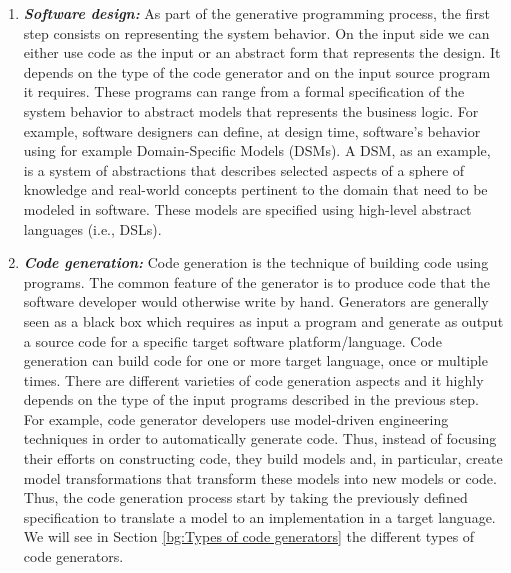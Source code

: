 \begin{enumerate}
	\item \textbf{\textit{Software design:}} 
	As part of the generative programming process, the first step consists on representing the system behavior. 
	On the input side we can either use code as the input or an abstract form that represents the design. It depends on the type of the code generator and on the input source program it requires. These programs can range from a formal specification of the system behavior to abstract models that represents the business logic.
	For example, software designers can define, at design time, software’s behavior using for example Domain-Specific Models (DSMs).
	A DSM, as an example, is a system of abstractions that describes selected aspects of a sphere of knowledge and real-world concepts pertinent to the domain that need to be modeled in software. These models are specified using high-level abstract languages (i.e., DSLs). %
	
	\item \textbf{\textit{Code generation:}} 
	Code generation is the technique of building code using programs. The common feature of the generator is to produce code that the software developer would otherwise write by hand.
	Generators are generally seen as a black box which requires as input a program and generate as output a source code for a specific target software platform/language. %
	Code generation can build code for one or more target language, once or multiple times. There are different varieties of code generation aspects and it highly depends on the type of the input programs described in the previous step. 
	For example, code generator developers use model-driven engineering techniques in order to automatically generate code. Thus, instead of focusing their efforts on constructing code, they build models and, in particular, create model transformations that transform these models into new models or code. Thus, the code generation process start by taking the previously defined specification to translate a model to an implementation in a target language. We will see in Section \ref{bg:Types of code generators} the different types of code generators.
	

\end{enumerate}
